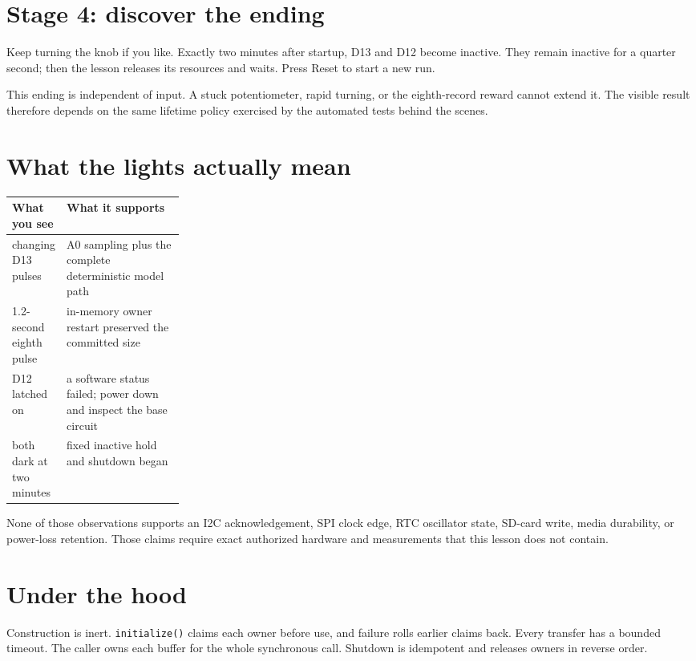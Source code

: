 \documentclass[11pt]{article}
\begin{document}
\section*{Stage 4: discover the ending}

Keep turning the knob if you like. Exactly two minutes after startup, D13 and
D12 become inactive. They remain inactive for a quarter second; then the
lesson releases its resources and waits. Press Reset to start a new run.

This ending is independent of input. A stuck potentiometer, rapid turning, or
the eighth-record reward cannot extend it. The visible result therefore
depends on the same lifetime policy exercised by the automated tests behind
the scenes.

\section*{What the lights actually mean}

\begin{tabularx}{\linewidth}{@{}p{0.25\linewidth}X@{}}
\toprule
What you see & What it supports\\\midrule
changing D13 pulses & A0 sampling plus the complete deterministic model path\\
1.2-second eighth pulse & in-memory owner restart preserved the committed size\\
D12 latched on & a software status failed; power down and inspect the base circuit\\
both dark at two minutes & fixed inactive hold and shutdown began\\
\bottomrule
\end{tabularx}

None of those observations supports an I2C acknowledgement, SPI clock edge,
RTC oscillator state, SD-card write, media durability, or power-loss
retention. Those claims require exact authorized hardware and measurements
that this lesson does not contain.

\section*{Under the hood}

Construction is inert. \texttt{initialize()} claims each owner before use,
and failure rolls earlier claims back. Every transfer has a bounded timeout.
The caller owns each buffer for the whole synchronous call. Shutdown is
idempotent and releases owners in reverse order.
\end{document}
